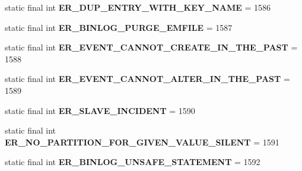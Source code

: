 \begin{DoxyCompactItemize}
static final int {\bfseries E\+R\+\_\+\+D\+U\+P\+\_\+\+E\+N\+T\+R\+Y\+\_\+\+W\+I\+T\+H\+\_\+\+K\+E\+Y\+\_\+\+N\+A\+ME} = 1586
\item 
\mbox{\label{classcom_1_1mysql_1_1jdbc_1_1_mysql_error_numbers_a391945133d55e4fb852f8042d8640850}} 
static final int {\bfseries E\+R\+\_\+\+B\+I\+N\+L\+O\+G\+\_\+\+P\+U\+R\+G\+E\+\_\+\+E\+M\+F\+I\+LE} = 1587
\item 
\mbox{\label{classcom_1_1mysql_1_1jdbc_1_1_mysql_error_numbers_a0c933653153206041827e116706e3fd4}} 
static final int {\bfseries E\+R\+\_\+\+E\+V\+E\+N\+T\+\_\+\+C\+A\+N\+N\+O\+T\+\_\+\+C\+R\+E\+A\+T\+E\+\_\+\+I\+N\+\_\+\+T\+H\+E\+\_\+\+P\+A\+ST} = 1588
\item 
\mbox{\label{classcom_1_1mysql_1_1jdbc_1_1_mysql_error_numbers_a1a475bbe793e92d311b0c8d0dfbae984}} 
static final int {\bfseries E\+R\+\_\+\+E\+V\+E\+N\+T\+\_\+\+C\+A\+N\+N\+O\+T\+\_\+\+A\+L\+T\+E\+R\+\_\+\+I\+N\+\_\+\+T\+H\+E\+\_\+\+P\+A\+ST} = 1589
\item 
\mbox{\label{classcom_1_1mysql_1_1jdbc_1_1_mysql_error_numbers_a3838b3106dcfbf331de7c4b623a2689a}} 
static final int {\bfseries E\+R\+\_\+\+S\+L\+A\+V\+E\+\_\+\+I\+N\+C\+I\+D\+E\+NT} = 1590
\item 
\mbox{\label{classcom_1_1mysql_1_1jdbc_1_1_mysql_error_numbers_a8a6ecd5a1f5dfc04b0b7c0efeed5eff0}} 
static final int {\bfseries E\+R\+\_\+\+N\+O\+\_\+\+P\+A\+R\+T\+I\+T\+I\+O\+N\+\_\+\+F\+O\+R\+\_\+\+G\+I\+V\+E\+N\+\_\+\+V\+A\+L\+U\+E\+\_\+\+S\+I\+L\+E\+NT} = 1591
\item 
\mbox{\label{classcom_1_1mysql_1_1jdbc_1_1_mysql_error_numbers_af534dab3d065acc8b3ad8f366c3ed3dd}} 
static final int {\bfseries E\+R\+\_\+\+B\+I\+N\+L\+O\+G\+\_\+\+U\+N\+S\+A\+F\+E\+\_\+\+S\+T\+A\+T\+E\+M\+E\+NT} = 1592
\item 
\mbox{\label{classcom_1_1mysql_1_1jdbc_1_1_mysql_error_numbers_a75dd638eb5e674c8eee6511bc6cf76fd}} 

\end{DoxyCompactItemize}
